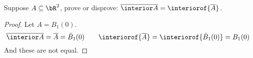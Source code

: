 \documentclass[10pt]{article}
\begin{document}
\begin{exercise*}

    Suppose $A\subseteq\bR^2$, prove or disprove: $\overline{\interior A}=\interiorof{\overline A}$.

\end{exercise*}

\begin{proof}

    Let $A=B_1(0)$.
        \[ \overline{\interior A} = \overline{A} = \bar B_1(0) \qquad
           \interiorof{\overline A} = \interiorof{\bar B_1(0)} = B_1(0) \]
    And these are not equal.

\end{proof}
\end{document}
